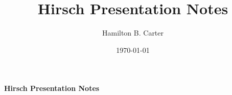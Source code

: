 \documentclass[prb,preprint]
{revtex4-1}
\begin{document}

\title{Hirsch Presentation Notes}

\author{Hamilton B. Carter}



\date{\today}









\centerline{\bf Hirsch Presentation Notes}
\bigskip
\end{document}

